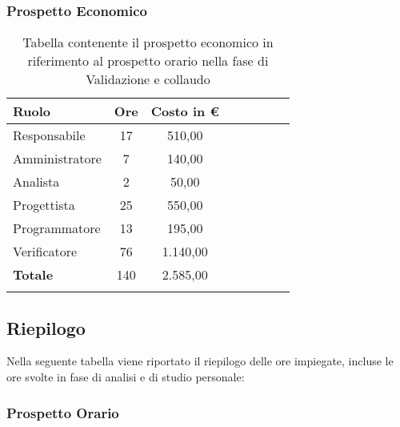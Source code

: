 \documentclass[../piano_di_progetto.tex]{subfiles}
\begin{document}
\subsubsection{Prospetto Economico}

\begin{center}
	\begin{longtable}{|l|c|c|c|c|c|c|c|}
		\hline
		\rowcolor{lightgray}
		\textbf{Ruolo} & \textbf{Ore} & \textbf{Costo in €}\\

		\hline
		Responsabile & 17 & 510,00\\
		\hline
		Amministratore & 7 & 140,00\\
		\hline
		Analista & 2 & 50,00\\
		\hline
		Progettista & 25 & 550,00\\
		\hline
		Programmatore & 13 & 195,00\\
		\hline
		Verificatore & 76 & 1.140,00\\
		\hline
		\textbf{Totale} & 140 & 2.585,00\\
		\hline
		\caption{Tabella contenente il prospetto economico in riferimento al prospetto orario nella fase di Validazione e collaudo}
	\end{longtable}
\end{center}


\subsection{Riepilogo}%
\label{sub:riepilog}
Nella seguente tabella viene riportato il riepilogo delle ore impiegate, incluse le ore svolte in fase di analisi e di studio personale:

\subsubsection{Prospetto Orario}
\end{document}
